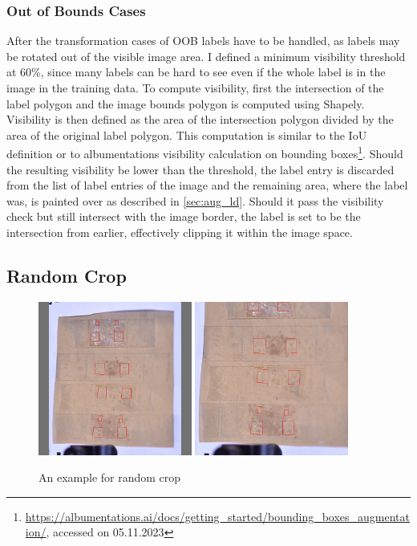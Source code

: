 \documentclass[10pt]{book}
\begin{document}
\subsubsection{Out of Bounds Cases}
\label{sec:oob}

After the transformation cases of \ac{OOB} labels have to be handled, as labels may be rotated out of the visible image area. I defined a minimum visibility threshold at 60\%, since many labels can be hard to see even if the whole label is in the image in the training data. To compute visibility, first the intersection of the label polygon and the image bounds polygon is computed using Shapely. Visibility is then defined as the area of the intersection polygon divided by the area of the original label polygon. This computation is similar to the \ac{IoU} definition or to albumentations visibility calculation on bounding boxes\footnote{\url{https://albumentations.ai/docs/getting_started/bounding_boxes_augmentation/}, accessed on 05.11.2023}. Should the resulting visibility be lower than the threshold, the label entry is discarded from the list of label entries of the image and the remaining area, where the label was, is painted over as described in \autoref{sec:aug_ld}. Should it pass the visibility check but still intersect with the image border, the label is set to be the intersection from earlier, effectively clipping it within the image space.

\subsection{Random Crop}

\begin{figure}
  \centering
     {\includegraphics[width=0.45\textwidth]{image/aug_rc_before}}
     {\includegraphics[width=0.45\textwidth]{image/aug_rc_after}}
  \caption{An example for random crop}
  \label{fig:aug_rc_example}
\end{figure}
\end{document}
